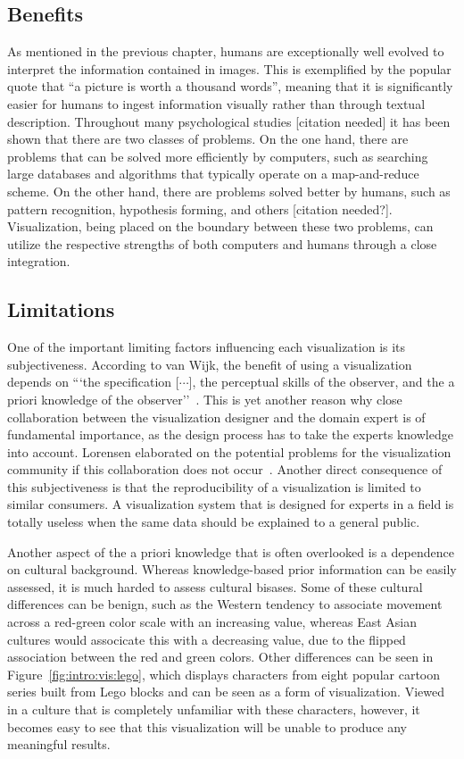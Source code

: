 \subsection{Benefits} \label{cha:intro:vis:benefits}
As mentioned in the previous chapter, humans are exceptionally well evolved to interpret the information contained in images.  This is exemplified by the popular quote that ``a picture is worth a thousand words'', meaning that it is significantly easier for humans to ingest information visually rather than through textual description.  Throughout many psychological studies [citation needed] it has been shown that there are two classes of problems.  On the one hand, there are problems that can be solved more efficiently by computers, such as searching large databases and algorithms that typically operate on a map-and-reduce scheme.  On the other hand, there are problems solved better by humans, such as pattern recognition, hypothesis forming, and others [citation needed?].  Visualization, being placed on the boundary between these two problems, can utilize the respective strengths of both computers and humans through a close integration.

\subsection{Limitations} \label{cha:intro:vis:limitations}
One of the important limiting factors influencing each visualization is its subjectiveness.  According to van Wijk, the benefit of using a visualization depends on ```the specification [$\cdots$], the perceptual skills of the observer, and the a priori knowledge of the observer''~\cite{van2005value}.  This is yet another reason why close collaboration between the visualization designer and the domain expert is of fundamental importance, as the design process has to take the experts knowledge into account.  Lorensen elaborated on the potential problems for the visualization community if this collaboration does not occur~\cite{lorensen2004death}.  Another direct consequence of this subjectiveness is that the reproducibility of a visualization is limited to similar consumers.  A visualization system that is designed for experts in a field is totally useless when the same data should be explained to a general public.  

Another aspect of the a priori knowledge that is often overlooked is a dependence on cultural background.  Whereas knowledge-based prior information can be easily assessed, it is much harded to assess cultural bisases.  Some of these cultural differences can be benign, such as the Western tendency to associate movement across a red-green color scale with an increasing value, whereas East Asian cultures would associcate this with a decreasing value, due to the flipped association between the red and green colors.  Other differences can be seen in Figure~\ref{fig:intro:vis:lego}, which displays characters from eight popular cartoon series built from Lego blocks and can be seen as a form of visualization.  Viewed in a culture that is completely unfamiliar with these characters, however, it becomes easy to see that this visualization will be unable to produce any meaningful results.

